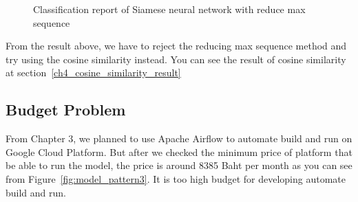 \documentclass[12pt,oneside,openright,a4paper]{cpe-english-project}
\begin{document}
\begin{figure}[!h]\centering
{}
\caption{Classification report of Siamese neural network with reduce max sequence}
\label{fig:reduce_sequence_result}
\end{figure}

From the result above, we have to reject the reducing max sequence method and
try using the cosine similarity instead. You can see the result of cosine similarity
at section~\ref*{ch4_cosine_similarity_result}

\subsection{Budget Problem}
From Chapter 3, we planned to use Apache Airflow to automate build and run on Google Cloud Platform.
But after we checked the minimum price of platform that be able to run the model,
the price is around 8385 Baht per month as you can see from Figure~\ref*{fig:model_pattern3}.
It is too high budget for developing automate build and run.
\end{document}
